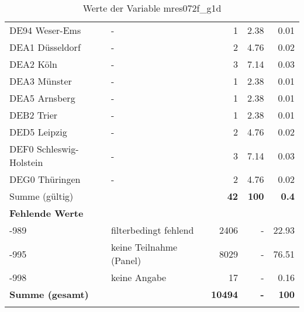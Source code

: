 \begin{longtable}{Xlrrr}
        \multicolumn{1}{X}{DE94 Weser-Ems} & - & \num{1} & \num[round-mode=places,round-precision=2]{2.38} & \num[round-mode=places,round-precision=2]{0.01} \\
        \multicolumn{1}{X}{DEA1 Düsseldorf} & - & \num{2} & \num[round-mode=places,round-precision=2]{4.76} & \num[round-mode=places,round-precision=2]{0.02} \\
        \multicolumn{1}{X}{DEA2 Köln} & - & \num{3} & \num[round-mode=places,round-precision=2]{7.14} & \num[round-mode=places,round-precision=2]{0.03} \\
        \multicolumn{1}{X}{DEA3 Münster} & - & \num{1} & \num[round-mode=places,round-precision=2]{2.38} & \num[round-mode=places,round-precision=2]{0.01} \\
        \multicolumn{1}{X}{DEA5 Arnsberg} & - & \num{1} & \num[round-mode=places,round-precision=2]{2.38} & \num[round-mode=places,round-precision=2]{0.01} \\
        \multicolumn{1}{X}{DEB2 Trier} & - & \num{1} & \num[round-mode=places,round-precision=2]{2.38} & \num[round-mode=places,round-precision=2]{0.01} \\
        \multicolumn{1}{X}{DED5 Leipzig} & - & \num{2} & \num[round-mode=places,round-precision=2]{4.76} & \num[round-mode=places,round-precision=2]{0.02} \\
        \multicolumn{1}{X}{DEF0 Schleswig-Holstein} & - & \num{3} & \num[round-mode=places,round-precision=2]{7.14} & \num[round-mode=places,round-precision=2]{0.03} \\
        \multicolumn{1}{X}{DEG0 Thüringen} & - & \num{2} & \num[round-mode=places,round-precision=2]{4.76} & \num[round-mode=places,round-precision=2]{0.02} \\
     \midrule
      \multicolumn{2}{l}{Summe (gültig)} & \textbf{\num{42}} &
      \textbf{\num{100}} &
         \textbf{\num[round-mode=places,round-precision=2]{0.4}} \\
     \multicolumn{5}{l}{\textbf{Fehlende Werte}}\\
       -989 & filterbedingt fehlend & \num{2406} & - & \num[round-mode=places,round-precision=2]{22.93} \\

       -995 & keine Teilnahme (Panel) & \num{8029} & - & \num[round-mode=places,round-precision=2]{76.51} \\

       -998 & keine Angabe & \num{17} & - & \num[round-mode=places,round-precision=2]{0.16} \\

     \midrule
     \multicolumn{2}{l}{\textbf{Summe (gesamt)}} & \textbf{\num{10494}} & \textbf{-} & \textbf{\num{100}} \\
     \bottomrule
     \caption{Werte der Variable mres072f\_g1d}
     \end{longtable}
     
